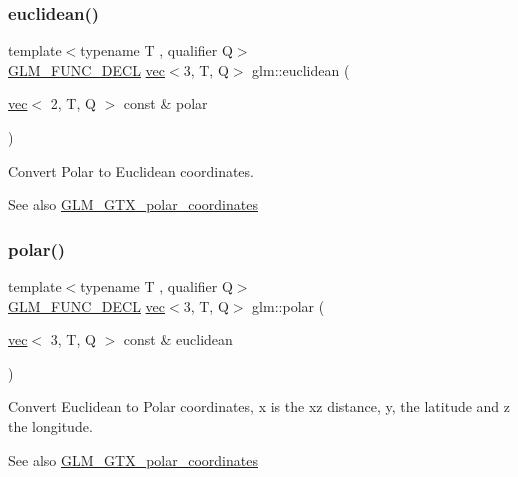 \subsubsection{\texorpdfstring{euclidean()}{euclidean()}}
{\footnotesize\ttfamily template$<$typename T , qualifier Q$>$ \\
\hyperlink{setup_8hpp_ab2d052de21a70539923e9bcbf6e83a51}{G\+L\+M\+\_\+\+F\+U\+N\+C\+\_\+\+D\+E\+CL} \hyperlink{structglm_1_1vec}{vec}$<$3, T, Q$>$ glm\+::euclidean (\begin{DoxyParamCaption}\item[{\hyperlink{structglm_1_1vec}{vec}$<$ 2, T, Q $>$ const \&}]{polar }\end{DoxyParamCaption})}

Convert Polar to Euclidean coordinates.

\begin{DoxySeeAlso}{See also}
\hyperlink{group__gtx__polar__coordinates}{G\+L\+M\+\_\+\+G\+T\+X\+\_\+polar\+\_\+coordinates} 
\end{DoxySeeAlso}
\mbox{\label{group__gtx__polar__coordinates_gab83ac2c0e55b684b06b6c46c28b1590d}} 
\subsubsection{\texorpdfstring{polar()}{polar()}}
{\footnotesize\ttfamily template$<$typename T , qualifier Q$>$ \\
\hyperlink{setup_8hpp_ab2d052de21a70539923e9bcbf6e83a51}{G\+L\+M\+\_\+\+F\+U\+N\+C\+\_\+\+D\+E\+CL} \hyperlink{structglm_1_1vec}{vec}$<$3, T, Q$>$ glm\+::polar (\begin{DoxyParamCaption}\item[{\hyperlink{structglm_1_1vec}{vec}$<$ 3, T, Q $>$ const \&}]{euclidean }\end{DoxyParamCaption})}

Convert Euclidean to Polar coordinates, x is the xz distance, y, the latitude and z the longitude.

\begin{DoxySeeAlso}{See also}
\hyperlink{group__gtx__polar__coordinates}{G\+L\+M\+\_\+\+G\+T\+X\+\_\+polar\+\_\+coordinates} 
\end{DoxySeeAlso}
